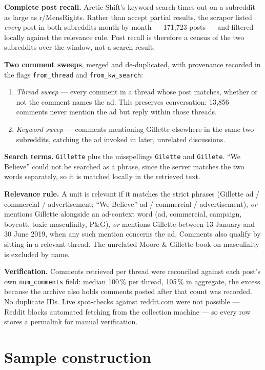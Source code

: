 \documentclass[11pt,a4paper]{article}
\newcommand{\code}[1]{\texttt{\small #1}}
\begin{document}
\textbf{Complete post recall.} Arctic Shift's keyword search times out on a subreddit as large as
r/MensRights. Rather than accept partial results, the scraper listed \emph{every} post in both
subreddits month by month --- 171{,}723 posts --- and filtered locally against the relevance rule.
Post recall is therefore a census of the two subreddits over the window, not a search result.

\textbf{Two comment sweeps}, merged and de-duplicated, with provenance recorded in the flags
\code{from\_thread} and \code{from\_kw\_search}:

\begin{enumerate}
\item \emph{Thread sweep} --- every comment in a thread whose post matches, whether or not the
comment names the ad. This preserves conversation: 13{,}856 comments never mention the ad but reply
within those threads.
\item \emph{Keyword sweep} --- comments mentioning Gillette elsewhere in the same two subreddits,
catching the ad invoked in later, unrelated discussions.
\end{enumerate}

\textbf{Search terms.} \code{Gillette} plus the misspellings \code{Gilette} and \code{Gillete}.
``We Believe'' could not be searched as a phrase, since the server matches the two words
separately, so it is matched locally in the retrieved text.

\textbf{Relevance rule.} A unit is relevant if it matches the strict phrases (Gillette
ad / commercial / advertisement; ``We Believe'' ad / commercial / advertisement), \emph{or} mentions
Gillette alongside an ad-context word (ad, commercial, campaign, boycott, toxic masculinity, P\&G),
\emph{or} mentions Gillette between 13 January and 30 June 2019, when any such mention concerns the
ad. Comments also qualify by sitting in a relevant thread. The unrelated Moore \& Gillette book on
masculinity is excluded by name.

\textbf{Verification.} Comments retrieved per thread were reconciled against each post's own
\code{num\_comments} field: median 100\,\% per thread, 105\,\% in aggregate, the excess because the
archive also holds comments posted after that count was recorded. No duplicate IDs. Live
spot-checks against reddit.com were not possible --- Reddit blocks automated fetching from the
collection machine --- so every row stores a permalink for manual verification.

\section{Sample construction}
\end{document}
